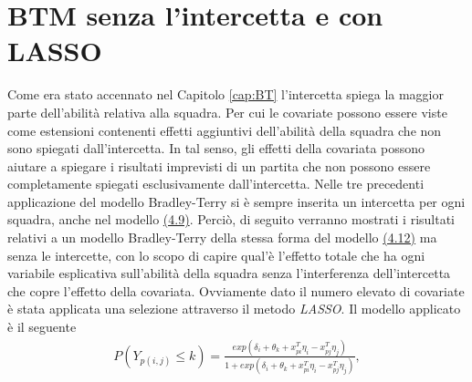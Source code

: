 \section{BTM senza l'intercetta e con LASSO}
Come era stato accennato nel Capitolo \ref{cap:BT} l'intercetta spiega la maggior parte dell'abilità relativa alla squadra. Per cui le covariate possono essere viste come estensioni contenenti effetti aggiuntivi dell'abilità della squadra che non sono spiegati dall'intercetta. In tal senso, gli effetti della covariata possono aiutare a spiegare i risultati imprevisti di un partita che non possono essere completamente spiegati esclusivamente dall'intercetta. Nelle tre precedenti applicazione del modello Bradley-Terry si è sempre inserita un intercetta per ogni squadra, anche nel modello \hyperref[for:3.9]{(4.9)}. Perciò, di seguito verranno mostrati i risultati relativi a un modello Bradley-Terry della stessa forma del modello \hyperref[for:4.9]{(4.12)} ma senza le intercette, con lo scopo di capire qual'è l'effetto totale che ha ogni variabile esplicativa sull'abilità della squadra senza l'interferenza dell'intercetta che copre l'effetto della covariata. Ovviamente dato il numero elevato di covariate è stata applicata una selezione attraverso il metodo \emph{LASSO}. Il modello applicato è il seguente
\begin{align}
	P(Y_{p(i,j)}\leq k) =  \frac{exp(\delta_i + \theta_{k} + x^T_{pi}\eta_i - x^T_{pj}\eta_j)}{1 + exp(\delta_i + \theta_{k} + x^T_{pi}\eta_i - x^T_{pj}\eta_j)},\label{for:5.2}
\end{align}

